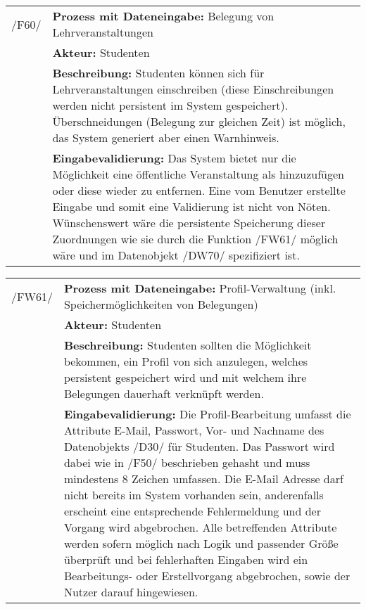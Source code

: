 \begin{tabular}{p{1.5cm}p{14.5cm}}

	 /F60/	& \textbf{Prozess mit Dateneingabe:} Belegung von Lehrveranstaltungen \\
				& \textbf{Akteur:} Studenten \\
				& \textbf{Beschreibung:} Studenten können sich für Lehrveranstaltungen einschreiben (diese Einschreibungen werden nicht persistent im System gespeichert). Überschneidungen (Belegung zur gleichen Zeit) ist möglich, das System generiert aber einen Warnhinweis. \\
				& \textbf{Eingabevalidierung:} Das System bietet nur die Möglichkeit eine öffentliche Veranstaltung als hinzuzufügen oder diese wieder zu entfernen. Eine vom Benutzer erstellte Eingabe und somit eine Validierung ist nicht von Nöten. Wünschenswert wäre die persistente Speicherung dieser Zuordnungen wie sie durch die Funktion /FW61/ möglich wäre und im Datenobjekt /DW70/ spezifiziert ist.\\[0.25cm]

\end{tabular}


\begin{tabular}{p{1.5cm}p{14.5cm}}
					
	 /FW61/& \textbf{Prozess mit Dateneingabe:} Profil-Verwaltung (inkl. Speichermöglichkeiten von Belegungen) \\
				& \textbf{Akteur:} Studenten \\
				& \textbf{Beschreibung:} Studenten sollten die Möglichkeit bekommen, ein Profil von sich anzulegen, welches persistent gespeichert wird und mit welchem ihre Belegungen dauerhaft verknüpft werden. \\
				& \textbf{Eingabevalidierung:} Die Profil-Bearbeitung umfasst die Attribute E-Mail, Passwort, Vor- und Nachname des Datenobjekts /D30/ für Studenten. Das Passwort wird dabei wie in /F50/ beschrieben gehasht und muss mindestens 8 Zeichen umfassen. Die E-Mail Adresse darf nicht bereits im System vorhanden sein, anderenfalls erscheint eine entsprechende Fehlermeldung und der Vorgang wird abgebrochen. Alle betreffenden Attribute werden sofern möglich nach Logik und passender Größe überprüft und bei fehlerhaften Eingaben wird ein Bearbeitungs- oder Erstellvorgang abgebrochen, sowie der Nutzer darauf hingewiesen.\\[0.25cm]

\end{tabular}


